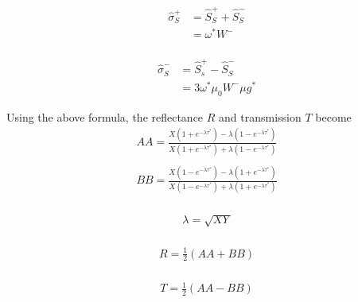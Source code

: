 \begin{equation}
\begin{aligned}
\hat{\sigma}_{S}^{+} &=\hat{S}_{S}^{+}+\hat{S}_{S}^{-} \\
&=\omega^{*} W^{-} \\
\end{aligned}
\end{equation}

\begin{equation}
\begin{aligned}
\hat{\sigma}_{S}^{-} &=\hat{S}_{s}^{+}-\hat{S}_{S}^{-} \\
&=3 \omega^{*} \mu_{0} W^{-} \mu g^{*}
\end{aligned}
\end{equation}

Using the above formula, the reflectance \(R\) and transmission \(T\)
become \begin{equation}
\begin{array}{c}
A A=\frac{X\left(1+e^{-\lambda \tau^{*}}\right)-\lambda\left(1-e^{-\lambda \tau^{*}}\right)}{X\left(1+e^{-\lambda \tau^{*}}\right)+\lambda\left(1-e^{-\lambda \tau^{*}}\right)} \\
\end{array}
\end{equation} \begin{equation}
\begin{array}{c}
B B=\frac{X\left(1-e^{-\lambda \tau^{*}}\right)-\lambda\left(1+e^{-\lambda \tau^{*}}\right)}{X\left(1-e^{-\lambda \tau^{*}}\right)+\lambda\left(1+e^{-\lambda \tau^{*}}\right)} \\
\end{array}
\end{equation}

\begin{equation}
\begin{array}{c}
\lambda=\sqrt{X Y} \\
\end{array}
\end{equation}

\begin{equation}
\begin{array}{c}
R=\frac{1}{2}(A A+B B) \\
\end{array}
\end{equation}

\begin{equation}
\begin{array}{c}
T=\frac{1}{2}(A A-B B)
\end{array}
\end{equation}

